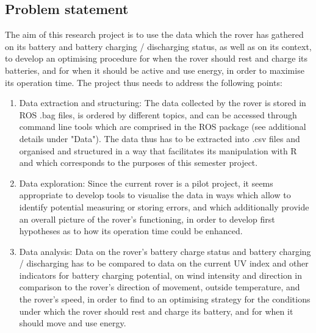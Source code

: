 \documentclass[11pt, UKenglish]{report}
\begin{document}
{\subsection*{Problem statement}

The aim of this research project is to use the data which the rover has gathered on its battery and battery charging / discharging status, as well as on its context, to develop an optimising procedure for when the rover should rest and charge its batteries, and for when it should be active and use energy, in order to maximise its operation time. The project thus needs to address the following points:

\begin{enumerate}

	\item{\large{Data extraction and structuring:} \normalsize The data collected by the rover is stored in ROS .bag files, is ordered by different topics, and can be accessed through command line tools which are comprised in the ROS package (see additional details under "Data"). The data thus has to be extracted into .csv files and organised and structured in a way that facilitates its manipulation with R and which corresponds to the purposes of this semester project.}

	\item{\large{Data exploration:} \normalsize Since the current rover is a pilot project, it seems appropriate to develop tools to visualise the data in ways which allow to identify potential measuring or storing errors, and which additionally provide an overall picture of the rover's functioning, in order to develop first hypotheses as to how its operation time could be enhanced.}

	\item{\large{Data analysis:} \normalsize Data on the rover's battery charge status and battery charging / discharging has to be compared to data on the current UV index and other indicators for battery charging potential, on wind intensity and direction in comparison to the rover's direction of movement, outside temperature, and the rover's speed, in order to find to an optimising strategy for the conditions under which the rover should rest and charge its battery, and for when it should move and use energy.}

\end{enumerate}

}
\end{document}
